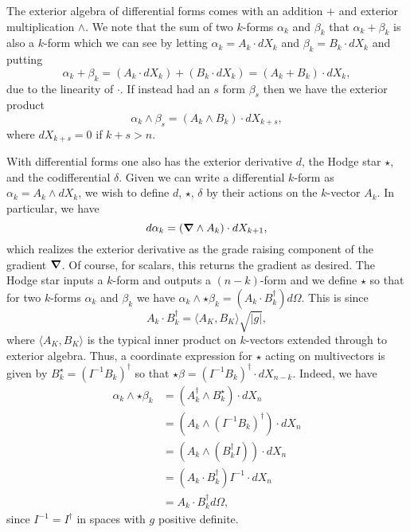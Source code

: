 The exterior algebra of differential forms comes with an addition $+$ and exterior multiplication $\wedge$.  We note that the sum of two $k$-forms $\alpha_k$ and $\beta_k$ that $\alpha_k+\beta_k$ is also a $k$-form which we can see by letting $\alpha_k = A_k \cdot dX_k$ and $\beta_k = B_k \cdot dX_k$ and putting
\[
\alpha_k + \beta_k = (A_k \cdot dX_k)+(B_k \cdot dX_k) = (A_k + B_k) \cdot dX_k,
\]
due to the linearity of $\cdot$.  If instead had an $s$ form $\beta_s$ then we have the exterior product
\[
\alpha_k \wedge \beta_s = (A_k \wedge B_k) \cdot dX_{k+s},
\]
where $dX_{k+s}=0$ if $k+s>n$.  

With differential forms one also has the exterior derivative $d$, the Hodge star $\star$, and the codifferential $\delta$.  Given we can write a differential $k$-form as $\alpha_k = A_k \wedge dX_k$, we wish to define $d$, $\star$, $\delta$ by their actions on the $k$-vector $A_k$.  In particular, we have
\[
d \alpha_k = (\boldsymbol{\nabla} \wedge A_k) \cdot dX_{k+1},
\]
which realizes the exterior derivative as the grade raising component of the gradient $\boldsymbol{\nabla}$. Of course, for scalars, this returns the gradient as desired.  The Hodge star inputs a $k$-form and outputs a $(n-k)$-form and we define $\star$ so that for two $k$-forms $\alpha_k$ and $\beta_k$ we have $\alpha_k \wedge \star \beta_k  = (A_k\cdot B_k^\dagger)d\Omega$.  This is since
\[
A_k \cdot B_k^\dagger = \langle A_{K}, B_{K} \rangle \sqrt{|g|},
\]
where $\langle A_{K}, B_{K} \rangle$ is the typical inner product on $k$-vectors extended through to exterior algebra. Thus, a coordinate expression for $\star$ acting on multivectors is given by $B_k^\star = (I^{-1} B_k)^\dagger$ so that $\star \beta = (I^{-1} B_k)^\dagger \cdot dX_{n-k}$.  Indeed, we have
\begin{align*}
    \alpha_k \wedge \star \beta_k &= (A_k^\dagger \wedge B_k^\star) \cdot dX_n\\
    &= (A_k \wedge (I^{-1}B_k)^\dagger )\cdot dX_n\\
    &= (A_k \wedge (B_k^\dagger I))\cdot dX_n\\
    &= (A_k \cdot B_k^\dagger) I^{-1} \cdot dX_n\\
    &= A_k \cdot B_k^\dagger d\Omega,
\end{align*}
since $I^{-1}=I^\dagger$ in spaces with $g$ positive definite.


